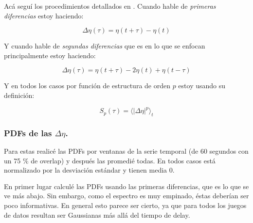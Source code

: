 Acá seguí los procedimientos detallados en \cite{falconObservationIntermittencyWave2007}. Cuando hable de \textit{primeras diferencias} estoy haciendo: 

\begin{equation}
	\Delta\eta(\tau) = \eta(t + \tau) - \eta(t) 
\end{equation} 

Y cuando hable de \textit{segundas diferencias} que es en lo que se enfocan principalmente estoy haciendo: 

\begin{equation}
	\Delta\eta(\tau) = \eta(t + \tau) - 2\eta(t) + \eta(t - \tau) 
\end{equation}

Y en todos los casos por función de estructura de orden $p$ estoy usando su definición: 

\begin{equation}
	S_p(\tau) = \langle |\Delta\eta|^p \rangle_t
\end{equation}

\subsubsection*{PDFs de las $\Delta\eta$.} 
Para estas realicé las PDFs por ventanas de la serie temporal (de 60 segundos con un 75 \% de overlap) y después las promedié todas. En todos casos está normalizado por la desviación estándar y tienen media 0. 

En primer lugar calculé las PDFs usando las primeras diferencias, que es lo que se ve más abajo. Sin embargo, como el espectro es muy empinado, éstas deberían ser poco informativas. En general esto parece ser cierto, ya que para todos los juegos de datos resultan ser Gaussianas más allá del tiempo de delay.

